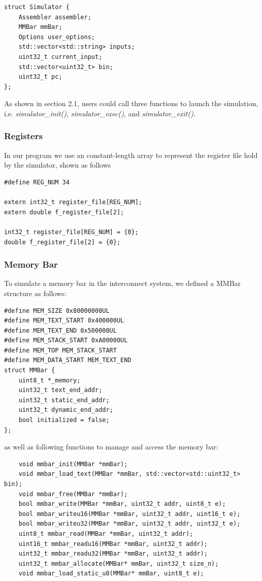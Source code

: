 \documentclass[conference, draftclsnofoot, letterpaper]{IEEETran}
\begin{document}
\begin{lstlisting}
struct Simulator {
	Assembler assembler;
	MMBar mmBar;
	Options user_options;
	std::vector<std::string> inputs;
	uint32_t current_input;
	std::vector<uint32_t> bin;
	uint32_t pc;
};
\end{lstlisting}
As shown in section 2.1, users could call three functions to launch the simulation, i.e. \emph{simulator\_init()}, \emph{simulator\_exec()}, and \emph{simulator\_exit()}. 

\subsubsection{Registers}

In our program we use an constant-length array to represent the register file hold by the simulator, shown as follows

\begin{lstlisting}
#define REG_NUM 34
	
extern int32_t register_file[REG_NUM];
extern double f_register_file[2];

int32_t register_file[REG_NUM] = {0};
double f_register_file[2] = {0};
\end{lstlisting}

\subsubsection{Memory Bar}

To simulate a memory bar in the interconnect system, we defined a MMBar structure as follows:
\begin{lstlisting}
#define MEM_SIZE 0x80000000UL
#define MEM_TEXT_START 0x400000UL
#define MEM_TEXT_END 0x500000UL
#define MEM_STACK_START 0xA00000UL
#define MEM_TOP MEM_STACK_START
#define MEM_DATA_START MEM_TEXT_END
struct MMBar {
	uint8_t *_memory;
	uint32_t text_end_addr;
	uint32_t static_end_addr;
	uint32_t dynamic_end_addr;
	bool initialized = false;
};
\end{lstlisting}
as well as following functions to manage and access the memory bar:
\begin{lstlisting}
	void mmbar_init(MMBar *mmBar);
	void mmbar_load_text(MMBar *mmBar, std::vector<std::uint32_t> bin);
	void mmbar_free(MMBar *mmBar);
	bool mmbar_write(MMBar *mmBar, uint32_t addr, uint8_t e);
	bool mmbar_writeu16(MMBar *mmBar, uint32_t addr, uint16_t e);
	bool mmbar_writeu32(MMBar *mmBar, uint32_t addr, uint32_t e);
	uint8_t mmbar_read(MMBar *mmBar, uint32_t addr);
	uint16_t mmbar_readu16(MMBar *mmBar, uint32_t addr);
	uint32_t mmbar_readu32(MMBar *mmBar, uint32_t addr);
	uint32_t mmbar_allocate(MMBar* mmBar, uint32_t size_n);
	void mmbar_load_static_u8(MMBar* mmBar, uint8_t e);
\end{lstlisting}
\end{document}
